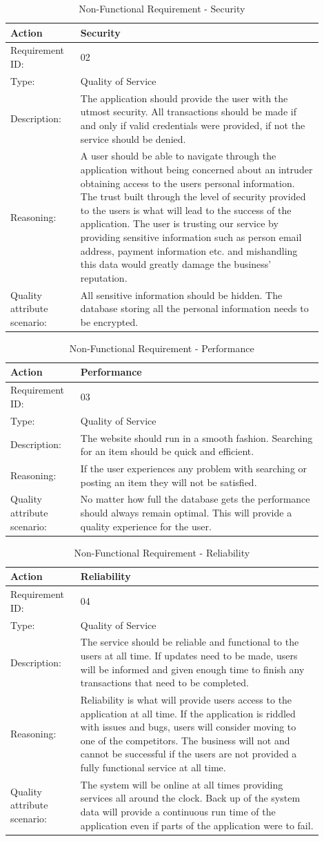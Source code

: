 \documentclass[11pt]{article}
\newcounter{use case ID}
\newcommand\addrow[2]{#1 & #2\\ \hline}
\newcounter{req ID}
\newcommand\tabularheadfsd[1]{
            \begin{table}[ht]
                \addtocounter{req ID}{1}
                \caption{Non-Functional Requirement \arabic{req ID} - #1}
                \vspace{0.2cm}
                \begin{tabular}{|p{0.2\linewidth}|p{0.70\linewidth}|}
                    \hline
                    \textbf{Action} & \textbf{#1} \\
                    \hline}
\newenvironment{requirement}{\tabularheadfsd}
                {\hline\end{tabular}\end{table}}
\begin{document}
\begin{requirement}{Security}
    \addrow{Requirement ID:}{02}
    \addrow{Type:}{Quality of Service}
    \addrow{Description:}{The application should provide the user with the utmost security. All transactions should be made if and only if valid credentials were provided, if not the service should be denied.}
    \addrow{Reasoning:}{A user should be able to navigate through the application without being concerned about an intruder obtaining access to the users personal information. The trust built through the level of security provided to the users is what will lead to the success of the application. The user is trusting our service by providing sensitive information such as person email address, payment information etc. and mishandling this data would greatly damage the business' reputation.  }
    \addrow{Quality attribute scenario:}{All sensitive information should be hidden. The database storing all the personal information needs to be encrypted.}
\end{requirement}

\begin{requirement}{Performance}
    \addrow{Requirement ID:}{03}
    \addrow{Type:}{Quality of Service}
    \addrow{Description:}{The website should run in a smooth fashion. Searching for an item should be quick and efficient.}
    \addrow{Reasoning:}{If the user experiences any problem with searching or posting an item they will not be satisfied.}
    \addrow{Quality attribute scenario:}{No matter how full the database gets the performance should always remain optimal. This will provide a quality experience for the user.}
\end{requirement}

\begin{requirement}{Reliability}
    \addrow{Requirement ID:}{04}
    \addrow{Type:}{Quality of Service}
    \addrow{Description:}{The service should be reliable and functional to the users at all time. If updates need to be made, users will be informed and given enough time to finish any transactions that need to be completed. }
    \addrow{Reasoning:}{Reliability is what will provide users access to the application at all time. If the application is riddled with issues and bugs, users will consider moving to one of the competitors. The business will not and cannot be successful if the users are not provided a fully functional service at all time. }
    \addrow{Quality attribute scenario:}{The system will be online at all times providing services all around the clock. Back up of the system data will provide a continuous run time of the application even if parts of the application were to fail.}
\end{requirement}
\end{document}
